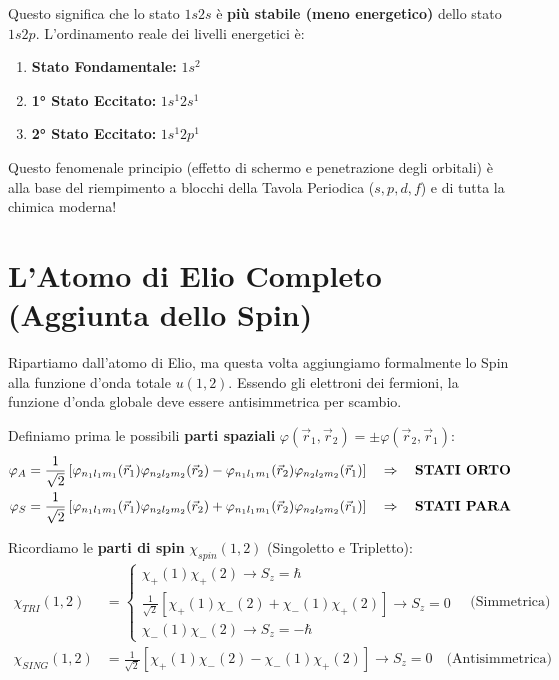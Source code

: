 \documentclass[11pt, a4paper]{article}
\begin{document}
\noindent
Questo significa che lo stato $1s2s$ è \textbf{più stabile (meno energetico)} dello stato $1s2p$. L'ordinamento reale dei livelli energetici è: %
\begin{enumerate}
    \item \textbf{Stato Fondamentale:} $1s^2$ %
    \item \textbf{1° Stato Eccitato:} $1s^1 2s^1$ %
    \item \textbf{2° Stato Eccitato:} $1s^1 2p^1$ %
\end{enumerate}

\noindent
Questo fenomenale principio (effetto di schermo e penetrazione degli orbitali) è alla base del riempimento a blocchi della Tavola Periodica ($s, p, d, f$) e di tutta la chimica moderna! %

\section{L'Atomo di Elio Completo (Aggiunta dello Spin)} %

Ripartiamo dall'atomo di Elio, ma questa volta aggiungiamo formalmente lo Spin alla funzione d'onda totale $u(1,2)$. %
Essendo gli elettroni dei fermioni, la funzione d'onda globale deve essere antisimmetrica per scambio. %

Definiamo prima le possibili \textbf{parti spaziali} $\varphi(\vec{r}_1, \vec{r}_2) = \pm \varphi(\vec{r}_2, \vec{r}_1)$: %
\begin{align}
    \varphi_A &= \frac{1}{\sqrt{2}} \left[ \varphi_{n_1 l_1 m_1}(\vec{r}_1) \varphi_{n_2 l_2 m_2}(\vec{r}_2) - \varphi_{n_1 l_1 m_1}(\vec{r}_2) \varphi_{n_2 l_2 m_2}(\vec{r}_1) \right] \quad \Rightarrow \quad \text{\textbf{STATI ORTO}} \\ %
    \varphi_S &= \frac{1}{\sqrt{2}} \left[ \varphi_{n_1 l_1 m_1}(\vec{r}_1) \varphi_{n_2 l_2 m_2}(\vec{r}_2) + \varphi_{n_1 l_1 m_1}(\vec{r}_2) \varphi_{n_2 l_2 m_2}(\vec{r}_1) \right] \quad \Rightarrow \quad \text{\textbf{STATI PARA}} %
\end{align}

Ricordiamo le \textbf{parti di spin} $\chi_{spin}(1,2)$ (Singoletto e Tripletto): %
\begin{align*}
    \chi_{TRI}(1,2) &= \begin{cases} 
        \chi_+(1)\chi_+(2) \rightarrow S_z = \hbar \\ 
        \frac{1}{\sqrt{2}} [\chi_+(1)\chi_-(2) + \chi_-(1)\chi_+(2)] \rightarrow S_z = 0 \\ 
        \chi_-(1)\chi_-(2) \rightarrow S_z = -\hbar 
    \end{cases} \quad \text{(Simmetrica)} \\ %
    \chi_{SING}(1,2) &= \frac{1}{\sqrt{2}} [\chi_+(1)\chi_-(2) - \chi_-(1)\chi_+(2)] \rightarrow S_z = 0 \quad \text{(Antisimmetrica)} %
\end{align*}
\end{document}
